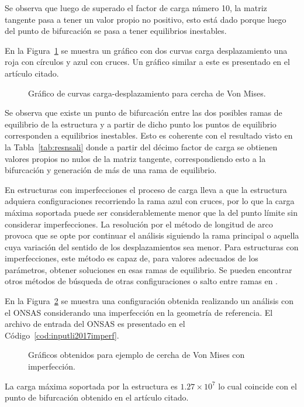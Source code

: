 Se observa que luego de superado el factor de carga número 10, la matriz tangente pasa a tener un valor propio no positivo, esto está dado porque luego del punto de bifurcación se pasa a tener equilibrios inestables. %
%

En la Figura~\ref{fig:grafli} se muestra un gráfico con dos curvas carga desplazamiento una roja con círculos y azul con cruces. Un gráfico similar a este es presentado en el artículo citado. %

\begin{figure}[htb]
	\centering
	\resizebox{.75\linewidth}{!}{}
	\caption{Gráfico de curvas carga-desplazamiento para cercha de Von Mises.}
	\label{fig:grafli}
\end{figure}

Se observa que existe un punto de bifurcación entre las dos posibles ramas de equilibrio de la estructura y a partir de dicho punto los puntos de equilibrio corresponden a equilibrios inestables. %
%
Esto es coherente con el resultado visto en la Tabla~\ref{tab:resnsali} donde a partir del décimo factor de carga se obtienen valores propios no nulos de la matriz tangente, correspondiendo esto a la bifurcación y generación de más de una rama de equilibrio.

En estructuras con imperfecciones el proceso de carga lleva a que la estructura adquiera configuraciones recorriendo la rama azul con cruces, por lo que la carga máxima soportada puede ser considerablemente menor que la del punto límite sin considerar imperfecciones. %
La resolución por el método de longitud de arco provoca que se opte por continuar el análisis siguiendo la rama principal o aquella cuya variación del sentido de los desplazamientos sea menor. Para estructuras con imperfecciones, este método es capaz de, para valores adecuados de los parámetros, obtener soluciones en esas ramas de equilibrio. %
%
Se pueden encontrar otros métodos de búsqueda de otras configuraciones o salto entre ramas en \citep{DeSouzaNeto2008,Crisfield1997}.

%
En la Figura~\ref{fig:vonmis} se muestra una configuración obtenida realizando un análisis con el ONSAS considerando una imperfección en la geometría de referencia. %
%
El archivo de entrada del ONSAS es presentado en el Código~\ref{cod:inputli2017imperf}.

\begin{figure}[htb]
	\centering
	\resizebox{.47\linewidth}{!}{}
	\resizebox{.47\linewidth}{!}{}
	\caption{Gráficos obtenidos para ejemplo de cercha de Von Mises con imperfección.}
	\label{fig:vonmis}
\end{figure}
%
La carga máxima soportada por la estructura es $1.27 \times 10^7$ lo cual coincide con el punto de bifurcación obtenido en el artículo citado.


